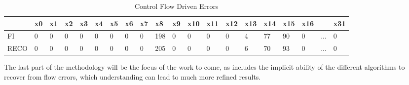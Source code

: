 \documentclass[./dissertation.tex]{subfiles}
\begin{document}
\begin{table}[H]
    \centering
    \caption{Control Flow Driven Errors}
    \begin{tabular}{|l|l|l|l|l|l|l|l|l|l|l|l|l|l|l|l|l|l|l|l|}
    \hline
        ~ & x0 & x1 & x2 & x3 & x4 & x5 & x6 & x7 & x8 & x9 & x10 & x11 & x12 & x13 & x14 & x15 & x16 & ~ & x31 \\ \hline
        FI & 0 & 0 & 0 & 0 & 0 & 0 & 0 & 0 & 198 & 0 & 0 & 0 & 0 & 4 & 77 & 90 & 0 & ... & 0 \\ \hline
        RECO & 0 & 0 & 0 & 0 & 0 & 0 & 0 & 0 & 205 & 0 & 0 & 0 & 0 & 6 & 70 & 93 & 0 & ... & 0 \\
        \hline
    \end{tabular}
\end{table}
\restoregeometry



The last part of the methodology will be the focus of the work to come, as includes the implicit ability of the different algorithms to recover from flow errors, which understanding can lead to much more refined results.
\label{sec:discussion}
\end{document}
